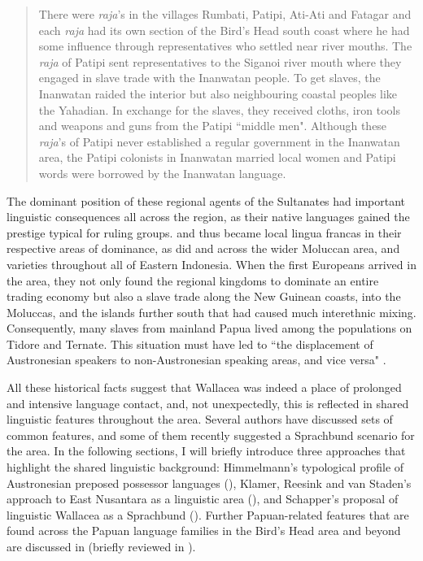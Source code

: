 \begin{quote}There were \textit{raja}'s in the villages Rumbati, Patipi, Ati-Ati and Fatagar and each \textit{raja} had its own section of the Bird's Head south coast where he had some influence through representatives who settled near river mouths. The \textit{raja} of Patipi sent representatives to the Siganoi river mouth where they engaged in slave trade with the Inanwatan people. To get slaves, the Inanwatan raided the interior but also neighbouring coastal peoples like the Yahadian. In exchange for the slaves, they received cloths, iron tools and weapons and guns from the Patipi ``middle men". Although these \textit{raja}'s of Patipi never established a regular government in the Inanwatan area, the Patipi colonists in Inanwatan married local women and Patipi words were borrowed by the Inanwatan language.\end{quote}

The dominant position of these regional agents of the Sultanates had important linguistic consequences all across the region, as their native languages gained the prestige typical for ruling groups.  and  thus became local lingua francas in their respective areas of dominance, as did  and  across the wider Moluccan area, and  varieties throughout all of Eastern Indonesia. When the first Europeans arrived in the area, they not only found the regional kingdoms to dominate an entire trading economy but also a slave trade along the New Guinean coasts, into the Moluccas, and the islands further south that had caused much interethnic mixing. Consequently, many slaves from mainland Papua lived among the populations on Tidore and Ternate. This situation must have led to ``the displacement of Austronesian speakers to non-Austronesian speaking areas, and vice versa" \citep[105f.]{klamer2008east}.

All these historical facts suggest that Wallacea was indeed a place of prolonged and intensive language contact, and, not unexpectedly, this is reflected in shared linguistic features throughout the area. Several authors have discussed sets of common features, and some of them recently suggested a Sprachbund scenario for the area. In the following sections, I will briefly introduce three approaches that highlight the shared linguistic background: Himmelmann's typological profile of Austronesian preposed possessor languages (), Klamer, Reesink and van Staden's approach to East Nusantara as a linguistic area (), and Schapper's proposal of linguistic Wallacea as a Sprachbund (). Further Papuan-related features that are found across the Papuan language families in the Bird's Head area and beyond are discussed in \citet{reesink2005west} (briefly reviewed in ).

